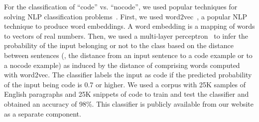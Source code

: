 \documentclass[smallextended]{svjour3}
\begin{document}
For the classification of ``code'' vs. ``nocode'', we used popular
techniques for solving NLP classification
problems~\cite{kusner2015word}.  First, we used
word2vec~\cite{mikolov2013distributed}, a popular NLP technique to
produce word embeddings. A word embedding is a mapping of words to
vectors of real numbers. Then, we used a multi-layer
perceptron~\cite{Rumelhart:1986:LIR:104279.104293} to infer the
probability of the input belonging or not to the class based on the
distance between sentences (\ie{}, the distance from an input sentence
to a code example or to a nocode example) as induced by the distance
of comprising words computed with word2vec. The classifier labels the
input as code if the predicted probability of the input being code is
0.7 or higher.  We used a corpus with 25K samples of English
paragraphs and 25K snippets of \js{} code to train and test the
classifier and obtained an accuracy of 98\%. This classifier is
publicly available from our website as a separate component.




\end{document}
